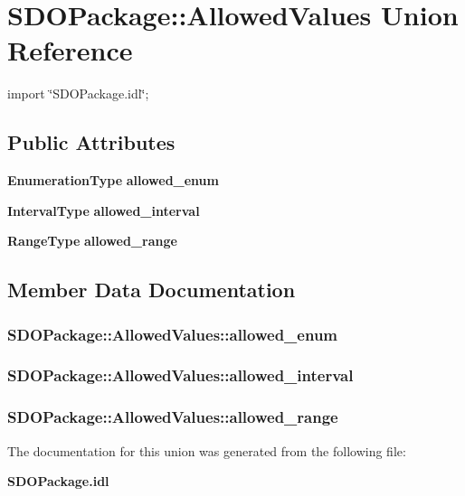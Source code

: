 \section{SDOPackage::AllowedValues Union Reference}
\label{unionSDOPackage_1_1AllowedValues}


{\ttfamily import \char`\"{}SDOPackage.idl\char`\"{};}

\subsection*{Public Attributes}
\begin{DoxyCompactItemize}
\item 
{\bf EnumerationType} {\bf allowed\_\-enum}
\item 
{\bf IntervalType} {\bf allowed\_\-interval}
\item 
{\bf RangeType} {\bf allowed\_\-range}
\end{DoxyCompactItemize}


\subsection{Member Data Documentation}
\subsubsection[{allowed\_\-enum}]{ {\bf SDOPackage::AllowedValues::allowed\_\-enum}}\label{unionSDOPackage_1_1AllowedValues_a52aa4da4d48dbaaa00f065a39b084507}
\subsubsection[{allowed\_\-interval}]{ {\bf SDOPackage::AllowedValues::allowed\_\-interval}}\label{unionSDOPackage_1_1AllowedValues_a9c74705f12153ddb248be33042e94208}
\subsubsection[{allowed\_\-range}]{ {\bf SDOPackage::AllowedValues::allowed\_\-range}}\label{unionSDOPackage_1_1AllowedValues_a9b722e71505439c91edf4d81429c6e84}


The documentation for this union was generated from the following file:\begin{DoxyCompactItemize}
\item 
{\bf SDOPackage.idl}\end{DoxyCompactItemize}

